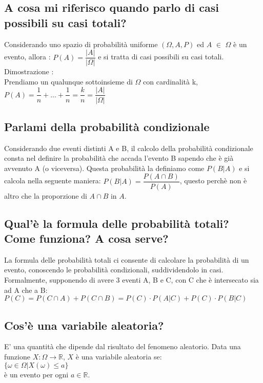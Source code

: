 \documentclass[a4paper,12pt]{report}
\begin{document}
	\subsection{A cosa mi riferisco quando parlo di casi possibili su casi totali?}
	Considerando uno spazio di probabilità uniforme $(\Omega, A, P)$ ed $A$ $\in$ $\Omega$ è un evento, allora : 
	$P(A) = \dfrac{|A|}{|\Omega|}$ e si tratta di casi possibili su casi totali.\\
	Dimostrazione : \\
	Prendiamo un qualunque sottoinsieme di $\Omega$ con cardinalità k, \\ $P(A) = \dfrac{1}{n} + ... + \dfrac{1}{n} = \dfrac{k}{n} = \dfrac{|A|}{|\Omega|}$
	\subsection{Parlami della probabilità condizionale}
	Considerando due eventi distinti A e B, il calcolo della probabilità condizionale consta nel definire la probabilità che accada l'evento B sapendo che è già avvenuto A (o viceversa). Questa probabilità la definiamo come $P(B|A)$ e si calcola nella seguente maniera: $P(B|A) = \dfrac{P(A \cap B)}{P(A)}$, questo perchè non è altro che la proporzione di $A \cap B$ in $A$.
	\subsection{Qual'è la formula delle probabilità totali? Come funziona? A cosa serve?}
	La formula delle probabilità totali ci consente di calcolare la probabilità di un evento, conoscendo le probabilità condizionali, suddividendolo in casi.
	Formalmente, supponendo di avere 3 eventi A, B e C, con C che è intersecato sia ad A che a B:
	$P(C) = P(C \cap A) + P(C \cap B) = P(C) \cdot P(A|C) + P(C) \cdot P(B|C)$
	\subsection{Cos'è una variabile aleatoria?}
	E' una quantità che dipende dal risultato del fenomeno aleatorio.
	Data una funzione $X:\Omega \rightarrow \mathbb{R}$, $X$ è una variabile aleatoria se: \\ $\{\omega \in \Omega | X(\omega) \leq a\}$ \\ è un evento per ogni $a \in \mathbb{R}$.
\end{document}
